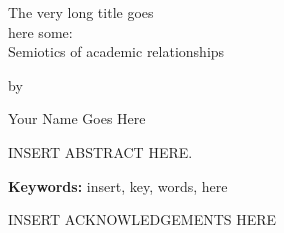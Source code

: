 \vspace{1.2cm}
\begin{center}\begin{spacing}{1}
{\Large The very long title goes\\\smallskip here some:\\\bigskip Semiotics of academic relationships\\}
\vspace{24pt}
{\Large by
\par
\vspace{5pt}
Your Name Goes Here\\[1.2cm]}
\end{spacing}\end{center}
\noindent
\begin{spacing}{1.7}
INSERT ABSTRACT HERE.
\end{spacing}
\begin{spacing}{1}
\vspace{40pt}

\noindent
\textbf{Keywords:} insert, key, words, here
\end{spacing}
\medskip



\newpage
{}
\begin{spacing}{1}
        \ackname
\end{spacing}
INSERT ACKNOWLEDGEMENTS HERE
\newpage



